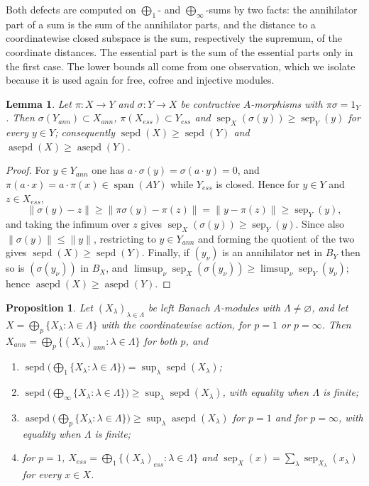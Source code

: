 \documentclass[11pt]{article}
\theoremstyle{plain}
\newtheorem{lemma}[theorem]{Lemma}
\newtheorem{proposition}[theorem]{Proposition}
\theoremstyle{definition}
\DeclareMathOperator{\sep}{sep}
\DeclareMathOperator{\sepd}{sepd}
\DeclareMathOperator{\asepd}{asepd}
\begin{document}
Both defects are computed on $\bigoplus_1$- and $\bigoplus_\infty$-sums by two
facts: the annihilator part of a sum is the sum of the annihilator parts, and the
distance to a coordinatewise closed subspace is the sum, respectively the
supremum, of the coordinate distances. The essential part is the sum of the
essential parts only in the first case. The lower bounds all come from one
observation, which we isolate because it is used again for free, cofree and
injective modules.

\begin{lemma}\label{SepUnderRetracts}
Let $\pi:X\to Y$ and $\sigma:Y\to X$ be contractive $A$-morphisms with
$\pi\sigma=1_Y$. Then $\sigma(Y_{ann})\subset X_{ann}$,
$\pi(X_{ess})\subset Y_{ess}$ and $\sep_X(\sigma(y))\geq\sep_Y(y)$ for every
$y\in Y$; consequently $\sepd(X)\geq\sepd(Y)$ and $\asepd(X)\geq\asepd(Y)$.
\end{lemma}

\begin{proof}
For $y\in Y_{ann}$ one has $a\cdot\sigma(y)=\sigma(a\cdot y)=0$, and
$\pi(a\cdot x)=a\cdot\pi(x)\in\operatorname{span}(AY)$ while $Y_{ess}$ is closed.
Hence for $y\in Y$ and $z\in X_{ess}$,
\[
\lVert\sigma(y)-z\rVert\geq\lVert\pi\sigma(y)-\pi(z)\rVert
=\lVert y-\pi(z)\rVert\geq\sep_Y(y) ,
\]
and taking the infimum over $z$ gives $\sep_X(\sigma(y))\geq\sep_Y(y)$. Since
also $\lVert\sigma(y)\rVert\leq\lVert y\rVert$, restricting to $y\in Y_{ann}$ and
forming the quotient of the two gives $\sepd(X)\geq\sepd(Y)$. Finally, if
${(y_\nu)}$ is an annihilator net in $B_Y$ then so is ${(\sigma(y_\nu))}$ in
$B_X$, and $\limsup_\nu\sep_X(\sigma(y_\nu))\geq\limsup_\nu\sep_Y(y_\nu)$; hence
$\asepd(X)\geq\asepd(Y)$.
\end{proof}

\begin{proposition}\label{SepOfSums}
Let ${(X_\lambda)}_{\lambda\in\Lambda}$ be left Banach $A$-modules with
$\Lambda\neq\varnothing$, and let $X=\bigoplus_p \{X_\lambda:\lambda\in\Lambda \}$
with the coordinatewise action, for $p=1$ or $p=\infty$. Then
$X_{ann}=\bigoplus_p \{{(X_\lambda)}_{ann}:\lambda\in\Lambda \}$ for both $p$,
and
\begin{enumerate}[label = (\roman*)]
\item $\sepd \bigl(\bigoplus_1 \{X_\lambda:\lambda\in\Lambda \} \bigr)
=\sup_\lambda\sepd(X_\lambda)$;

\item $\sepd \bigl(\bigoplus_\infty \{X_\lambda:\lambda\in\Lambda \} \bigr)
\geq\sup_\lambda\sepd(X_\lambda)$, with equality when $\Lambda$ is finite;

\item $\asepd \bigl(\bigoplus_p \{X_\lambda:\lambda\in\Lambda \} \bigr)
\geq\sup_\lambda\asepd(X_\lambda)$ for $p=1$ and for $p=\infty$, with equality
when $\Lambda$ is finite;

\item for $p=1$,
$X_{ess}=\bigoplus_1 \{{(X_\lambda)}_{ess}:\lambda\in\Lambda \}$ and
$\sep_X(x)=\sum_\lambda\sep_{X_\lambda}(x_\lambda)$ for every $x\in X$.
\end{enumerate}
\end{proposition}
\end{document}
